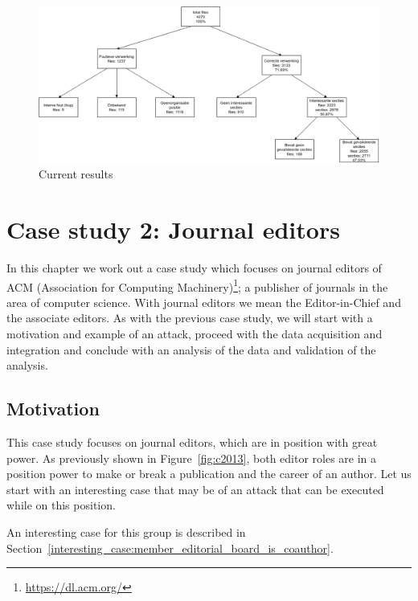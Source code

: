 \documentclass{ou-report}
\begin{document}
\begin{figure}[H]
    \centering
    \includegraphics[width=17cm]{images/lncs_front_matter_result.drawio.png}
    \caption{Current results}
    \label{fig:lncs_pdf_database}
\end{figure}


\chapter{Case study 2: Journal editors}
\label{chp:case2}
In this chapter we work out a case study which focuses on journal editors of 
ACM (Association for Computing Machinery)\footnote{\url{https://dl.acm.org/}}; 
a publisher of journals in the area of computer science.
With journal editors we mean the Editor-in-Chief and the associate editors.
As with the previous case study, we will start with a motivation and example of
an attack, proceed with the data acquisition and integration and conclude with
an analysis of the data and validation of the analysis.

\section{Motivation}
This case study focuses on journal editors, which are in position with great 
power. As previously shown in Figure~\ref{fig:c2013}, both editor roles are in 
a position power to make or break a publication and the career of an author.
Let us start with an interesting case that may be of an attack that can be 
executed while on this position.

An interesting case for this group is described in 
Section~\ref{interesting_case:member_editorial_board_is_coauthor}.
\end{document}
